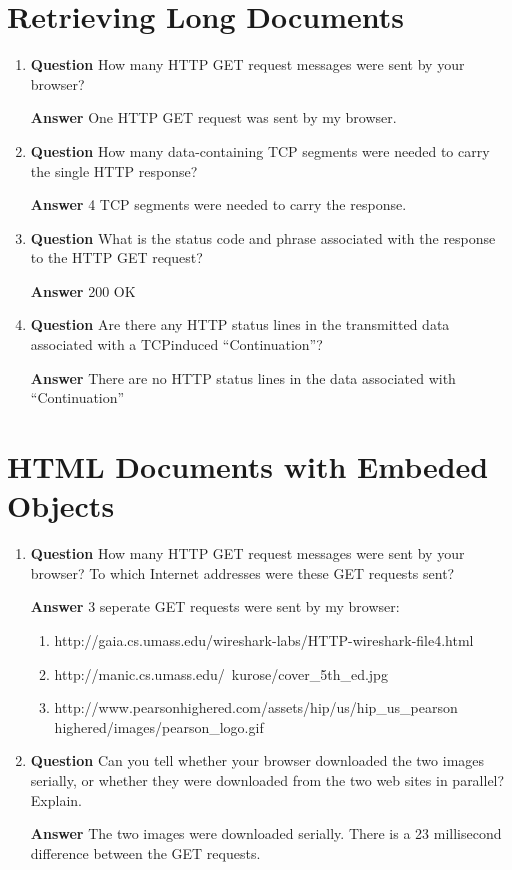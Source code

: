 \documentclass[12pt,letterpaper]{article}
\newcommand{\q}{\textbf{Question} }
\newcommand{\ans}{\textbf{Answer} }
\begin{document}
\section{Retrieving Long Documents}
\begin{enumerate}[resume]

\item \q How many HTTP GET request messages were sent by your browser? 

\ans One HTTP GET request was sent by my browser.

\item \q How many data-containing TCP segments were needed to carry the single
    HTTP response? 

\ans 4 TCP segments were needed to carry the response.

\item \q What is the status code and phrase associated with the response to the
    HTTP GET request? 

\ans 200 OK

\item \q Are there any HTTP status lines in the transmitted data associated
    with a TCPinduced ``Continuation''? 

\ans There are no HTTP status lines in the data associated with 
    ``Continuation''
\end{enumerate}


\pagebreak
\pagebreak


\section{HTML Documents with Embeded Objects}
\begin{enumerate}[resume]
\item \q How many HTTP GET request messages were sent by your browser?  To
    which Internet addresses were these GET requests sent? 

\ans 3 seperate GET requests were sent by my browser:
    \begin{enumerate}
        \item http://gaia.cs.umass.edu/wireshark-labs/HTTP-wireshark-file4.html
        \item http://manic.cs.umass.edu/~kurose/cover\_5th\_ed.jpg
        \item http://www.pearsonhighered.com/assets/hip/us/hip\_us\_pearson\\highered/images/pearson\_logo.gif
    \end{enumerate}

\item \q Can you tell whether your browser downloaded the two images serially,
    or whether they were downloaded from the two web sites in parallel?
    Explain.

\ans The two images were downloaded serially. There is a 23 millisecond
    difference between the GET requests.

\end{enumerate}
\end{document}
